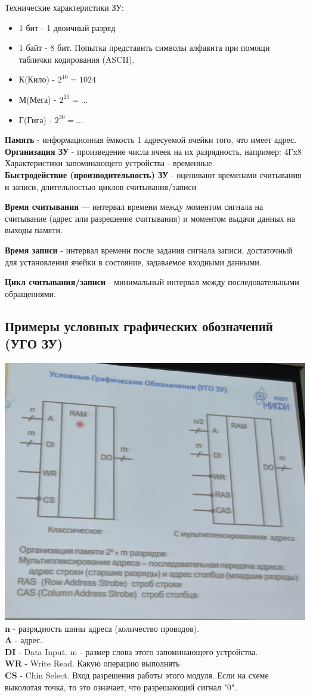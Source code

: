 \documentclass[12px]{article}
\begin{document}
Технические характеристики ЗУ: 
\begin{itemize}
    \item 1 бит - 1 двоичный разряд
    \item 1 байт - 8 бит. Попытка представить символы алфавита при помощи таблички кодирования (ASCII).
    \item К(Кило) - $2^{10} = 1024$
    \item М(Мега) - $2^{20} = ... $ 
    \item Г(Гига) - $2^{30} = ... $
\end{itemize}

\textbf{Память} - информационная ёмкость 1 адресуемой ячейки того, что имеет адрес. \\

\textbf{Организация ЗУ} - произведение числа ячеек на их разрядность, например: 4Гx8\\
Характеристики запоминающего устройства - временные.\\

\textbf{Быстродействие (производительность) ЗУ} - оценивают временами считывания и записи, длительностью циклов считывания/записи

\textbf{Время считывания} — интервал времени между моментом сигнала на считывание (адрес или разрешение считывания) и моментом выдачи данных на выходы памяти.

\textbf{Время записи} - интервал времени после задания сигнала записи, достаточный для установления ячейки в состояние, задаваемое входными данными.

\textbf{Цикл считывания/записи} - минимальный интервал между последовательными обращениями.
\subsection{Примеры условных графических обозначений (УГО ЗУ)}
\includegraphics[width=0.5\linewidth]{images/УГО ЗУ.jpg}\\
\textbf{n} - разрядность шины адреса (количество проводов). \\
\textbf{A} - адрес.\\
\textbf{DI} - Data Input. m - размер слова этого запоминающего устройства.\\
\textbf{WR} - Write Read. Какую операцию выполнять\\
\textbf{CS} - Chin Select. Вход разрешения работы этого модуля. Если на схеме выколотая точка, то это означает, что разрешающий сигнал "0".
\end{document}
